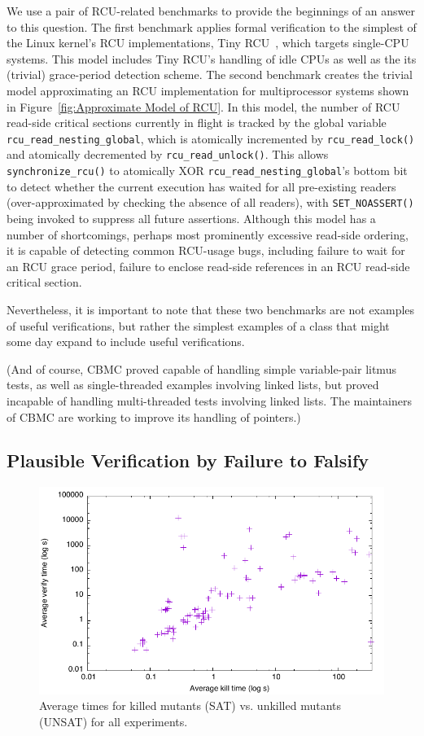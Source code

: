 \documentclass[conference]{IEEEtran}
\newcommand{\co}[1]{\lstinline[breaklines=yes,breakatwhitespace=yes]{#1}}
\begin{document}
We use a pair of RCU-related benchmarks to provide the beginnings of
an answer to this question.
The first benchmark applies formal verification to the simplest of
the Linux kernel's RCU implementations, Tiny
RCU~\cite{PaulEMcKenney2009BloatwatchRCU}, which targets single-CPU
systems.
This model includes Tiny RCU's handling of idle CPUs as well as
the its (trivial) grace-period detection scheme.
The second benchmark creates the trivial model approximating an RCU
implementation for multiprocessor systems shown in
Figure~\ref{fig:Approximate Model of RCU}.
In this model, the number of RCU read-side critical sections currently
in flight is tracked by the global variable \co{rcu_read_nesting_global},
which is atomically incremented by \co{rcu_read_lock()} and atomically
decremented by \co{rcu_read_unlock()}.
This allows \co{synchronize_rcu()} to atomically XOR
\co{rcu_read_nesting_global}'s bottom bit to detect whether the current
execution has waited for all pre-existing readers (over-approximated
by checking the absence of all readers), with \co{SET_NOASSERT()}
being invoked to suppress all future assertions.
Although this model has a number of shortcomings, perhaps most prominently
excessive read-side ordering, it is capable of detecting common
RCU-usage bugs, including failure to wait for an RCU grace period,
failure to enclose read-side references in an RCU read-side critical
section.

Nevertheless, it is important to note that these two benchmarks are not
examples of useful verifications, but rather the simplest examples of
a class that might some day expand to include useful verifications.

(And of course, CBMC proved capable of handling simple variable-pair
litmus tests, as well as single-threaded examples involving linked lists,
but proved incapable of handling multi-threaded tests involving linked
lists.
The maintainers of CBMC are working to improve its handling of pointers.)

\subsection{Plausible Verification by Failure to Falsify}
\label{sec:sattimes}

\begin{figure}
\includegraphics[width=\columnwidth]{sattimes}
\caption{Average times for killed mutants (SAT) vs. unkilled mutants 
  (UNSAT) for all experiments.}
\label{fig:sattimes}
\end{figure}
\end{document}
